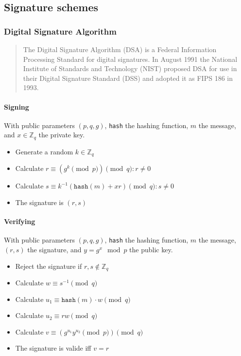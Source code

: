 \subsection{Signature schemes}
\subsubsection{Digital Signature Algorithm}

\begin{quote}
  The Digital Signature Algorithm (DSA) is a Federal Information Processing Standard
  for digital signatures. In August 1991 the National Institute of Standards and
  Technology (NIST) proposed DSA for use in their Digital Signature Standard (DSS)
  and adopted it as FIPS 186 in 1993.
\end{quote}

\paragraph{Signing}

With public parameters $(p, q, g)$, \texttt{hash} the hashing function,
$m$ the message, and $x \in \mathbb{Z}_q$ the private key.

\begin{itemize}
  \item Generate a random $k \in \mathbb{Z}_q$
  \item Calculate $r \equiv (g^k \pmod p) \pmod q : r \neq 0$
  \item Calculate $s \equiv k^{-1}(\texttt{hash}(m) + xr) \pmod q : s \neq 0$
  \item The signature is $(r, s)$
\end{itemize}

\paragraph{Verifying}

With public parameters $(p, q, g)$, \texttt{hash} the hashing function,
$m$ the message, $(r, s)$ the signature, and $y = g^x \mod p$ the public key.

\begin{itemize}
  \item Reject the signature if $r, s \notin \mathbb{Z}_q$
  \item Calculate $w \equiv s^{-1} \pmod q$
  \item Calculate $u_1 \equiv \texttt{hash}(m) \cdot w \pmod q$
  \item Calculate $u_2 \equiv rw \pmod q$
  \item Calculate $v \equiv (g^{u_1}y^{u_2} \pmod p) \pmod q$
  \item The signature is valide iff $v = r$
\end{itemize}

